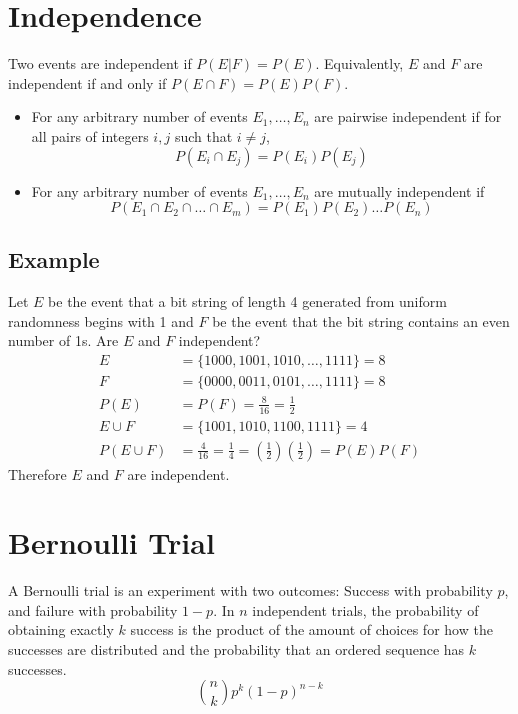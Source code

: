 \documentclass{article}
\theoremstyle{mytheoremstyle}
\theoremstyle{mytheoremstyle}
\theoremstyle{myproblemstyle}
\begin{document}
    \section*{Independence}
    Two events are independent if $P(E|F) = P(E)$. Equivalently, $E$ and $F$
    are independent if and only if $P(E\cap F) = P(E)P(F)$.
    \begin{itemize}
        \item For any arbitrary number of events $E_1,\dots,E_n$ are pairwise
            independent if  for all pairs of integers $i,j$ such that $i\ne j$,
            \[
                P(E_i\cap E_j)=P(E_i)P(E_j)
            \]
        \item For any arbitrary number of events $E_1,\dots,E_n$ are mutually
            independent if
            \[
                P(E_1\cap E_2\cap\dots\cap E_m)=P(E_1)P(E_2)\dots P(E_n)
            \]
    \end{itemize}

    \subsection*{Example}
    Let $E$ be the event that a bit string of length 4 generated from uniform
    randomness begins with 1 and $F$ be the event that the bit string contains
    an even number of 1s. Are $E$ and $F$ independent?
    \begin{align*}
        E &= \{1000, 1001, 1010,\dots, 1111\} = 8 \\
        F &= \{0000, 0011, 0101, \dots, 1111\} = 8 \\
        P(E) &= P(F) = \frac{8}{16} = \frac{1}{2} \\
        E\cup F &= \{1001, 1010, 1100, 1111\} = 4 \\
        P(E\cup F) &= \frac{4}{16} = \frac{1}{4} = (\frac{1}{2})(\frac{1}{2}) = P(E)P(F)
    \end{align*}
    Therefore $E$ and $F$ are independent.

    \section*{Bernoulli Trial}
    A Bernoulli trial is an experiment with two outcomes: Success with
    probability $p$, and failure with probability $1-p$. In $n$ independent
    trials, the probability of obtaining exactly $k$ success is the product of
    the amount of choices for how the successes are distributed and the
    probability that an ordered sequence has $k$ successes.
    \[
        \binom{n}{k}p^k(1-p)^{n-k}
    \]
\end{document}
